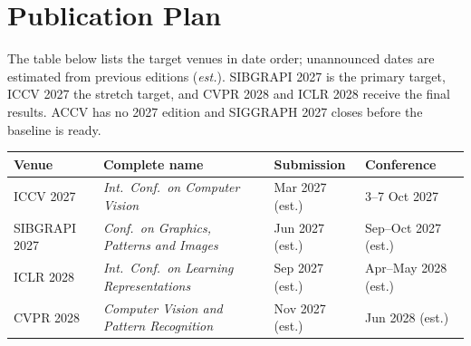 \documentclass[
	mscproposta, %
	english %
]{../ppgccufmg}
\begin{document}
    \section{Publication Plan}
        The table below lists the target venues in date order; unannounced dates are estimated from previous editions (\emph{est.}). SIBGRAPI 2027 is the primary target, ICCV 2027 the stretch target, and CVPR 2028 and ICLR 2028 receive the final results. ACCV has no 2027 edition and SIGGRAPH 2027 closes before the baseline is ready.
        \begin{center}
            \scriptsize\SingleSpacing
            \begin{tabular}{@{}llll@{}}
                \hline
                \textbf{Venue} & \textbf{Complete name} & \textbf{Submission} & \textbf{Conference} \\ \hline
                ICCV 2027 & \textit{Int.\ Conf.\ on Computer Vision} & Mar 2027 (est.) & 3--7 Oct 2027 \\
                SIBGRAPI 2027 & \textit{Conf.\ on Graphics, Patterns and Images} & Jun 2027 (est.) & Sep--Oct 2027 (est.) \\
                ICLR 2028 & \textit{Int.\ Conf.\ on Learning Representations} & Sep 2027 (est.) & Apr--May 2028 (est.) \\
                CVPR 2028 & \textit{Computer Vision and Pattern Recognition} & Nov 2027 (est.) & Jun 2028 (est.) \\ \hline
            \end{tabular}
        \end{center}
    \renewcommand\bibname{References} %
    
    {\scriptsize\SingleSpacing\setlength{\bibsep}{2pt}
    }
    
            
            
\end{document}
